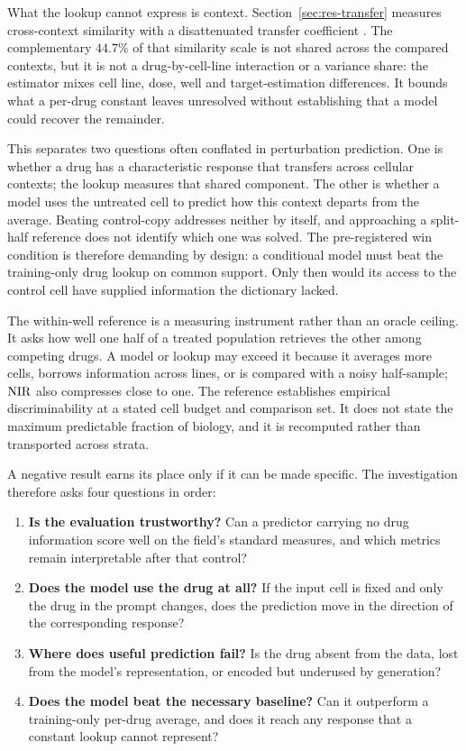 What the lookup cannot express is context. Section~\ref{sec:res-transfer} measures cross-context
similarity with a disattenuated transfer coefficient
. The complementary $44.7\%$ of that similarity scale is not shared
across the compared contexts, but it is not a drug-by-cell-line interaction or a variance share: the
estimator mixes cell line, dose, well and target-estimation differences. It bounds what a per-drug
constant leaves unresolved without establishing that a model could recover the remainder.

This separates two questions often conflated in perturbation prediction. One is whether a drug has
a characteristic response that transfers across cellular contexts; the lookup measures that shared
component. The other is whether a model uses the untreated cell to predict how this context departs
from the average. Beating control-copy addresses neither by itself, and approaching a split-half
reference does not identify which one was solved. The pre-registered win condition is therefore
demanding by design: a conditional model must beat the training-only drug lookup on common support.
Only then would its access to the control cell have supplied information the dictionary lacked.

The within-well reference is a measuring instrument rather than an oracle ceiling. It asks how well
one half of a treated population retrieves the other among competing drugs. A model or lookup may
exceed it because it averages more cells, borrows information across lines, or is compared with a
noisy half-sample; $\textrm{NIR}$ also compresses close to one. The reference establishes empirical
discriminability at a stated cell budget and comparison set. It does not state the maximum
predictable fraction of biology, and it is recomputed rather than transported across strata.

A negative result earns its place only if it can be made specific. The investigation therefore asks
four questions in order:

\begin{enumerate}
  \item \textbf{Is the evaluation trustworthy?} Can a predictor carrying no drug information score
        well on the field's standard measures, and which metrics remain interpretable after that
        control?
  \item \textbf{Does the model use the drug at all?} If the input cell is fixed and only the drug in
        the prompt changes, does the prediction move in the direction of the corresponding response?
  \item \textbf{Where does useful prediction fail?} Is the drug absent from the data, lost from the
        model's representation, or encoded but underused by generation?
  \item \textbf{Does the model beat the necessary baseline?} Can it outperform a training-only
        per-drug average, and does it reach any response that a constant lookup cannot represent?
\end{enumerate}

